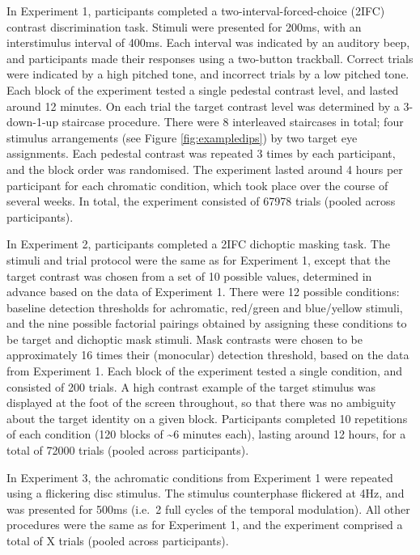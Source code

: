 \documentclass[
]{article}
\begin{document}
In Experiment 1, participants completed a two-interval-forced-choice (2IFC) contrast discrimination task. Stimuli were presented for 200ms, with an interstimulus interval of 400ms. Each interval was indicated by an auditory beep, and participants made their responses using a two-button trackball. Correct trials were indicated by a high pitched tone, and incorrect trials by a low pitched tone. Each block of the experiment tested a single pedestal contrast level, and lasted around 12 minutes. On each trial the target contrast level was determined by a 3-down-1-up staircase procedure. There were 8 interleaved staircases in total; four stimulus arrangements (see Figure \ref{fig:exampledips}) by two target eye assignments. Each pedestal contrast was repeated 3 times by each participant, and the block order was randomised. The experiment lasted around 4 hours per participant for each chromatic condition, which took place over the course of several weeks. In total, the experiment consisted of 67978 trials (pooled across participants).

In Experiment 2, participants completed a 2IFC dichoptic masking task. The stimuli and trial protocol were the same as for Experiment 1, except that the target contrast was chosen from a set of 10 possible values, determined in advance based on the data of Experiment 1. There were 12 possible conditions: baseline detection thresholds for achromatic, red/green and blue/yellow stimuli, and the nine possible factorial pairings obtained by assigning these conditions to be target and dichoptic mask stimuli. Mask contrasts were chosen to be approximately 16 times their (monocular) detection threshold, based on the data from Experiment 1. Each block of the experiment tested a single condition, and consisted of 200 trials. A high contrast example of the target stimulus was displayed at the foot of the screen throughout, so that there was no ambiguity about the target identity on a given block. Participants completed 10 repetitions of each condition (120 blocks of \textasciitilde6 minutes each), lasting around 12 hours, for a total of 72000 trials (pooled across participants).

In Experiment 3, the achromatic conditions from Experiment 1 were repeated using a flickering disc stimulus. The stimulus counterphase flickered at 4Hz, and was presented for 500ms (i.e.~2 full cycles of the temporal modulation). All other procedures were the same as for Experiment 1, and the experiment comprised a total of X trials (pooled across participants).
\end{document}
